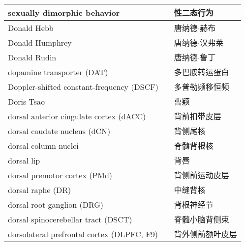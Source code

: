 \begin{longtable}{lll}
	\midrule
	sexually dimorphic behavior    &&  性二态行为  \\
	
	\midrule
	Donald Hebb    &&  唐纳德$\cdot$赫布  \\
	
	\midrule
	Donald Humphrey    &&  唐纳德$\cdot$汉弗莱  \\
	
	\midrule
	Donald Rudin    &&  唐纳德$\cdot$鲁丁  \\
	
	\midrule
	dopamine transporter (DAT)     &&  多巴胺转运蛋白  \\
	
	\midrule
	Doppler-shifted constant-frequency (DSCF)     &&  多普勒频移恒频  \\
	
	\midrule
	Doris Tsao     &&  曹颖  \\
	
	\midrule
	dorsal anterior cingulate cortex (dACC)     &&  背前扣带皮层  \\
	
	\midrule
	dorsal caudate nucleus (dCN)     &&  背侧尾核  \\
	
	\midrule
	dorsal column nuclei  && 脊髓背根核
	\\
	
	\midrule
	dorsal lip     &&  背唇  \\
	
	\midrule
	dorsal premotor cortex (PMd)     &&  背侧前运动皮层  \\
	
	\midrule
	dorsal raphe (DR)     &&  中缝背核  \\
	
	\midrule
	dorsal root ganglion (DRG)     &&  背根神经节  \\
	
	\midrule
	dorsal spinocerebellar tract (DSCT)     &&  脊髓小脑背侧束  \\
	
	\midrule
	dorsolateral prefrontal cortex (DLPFC, F9)     &&  背外侧前额叶皮层  \\
	

\end{longtable}
